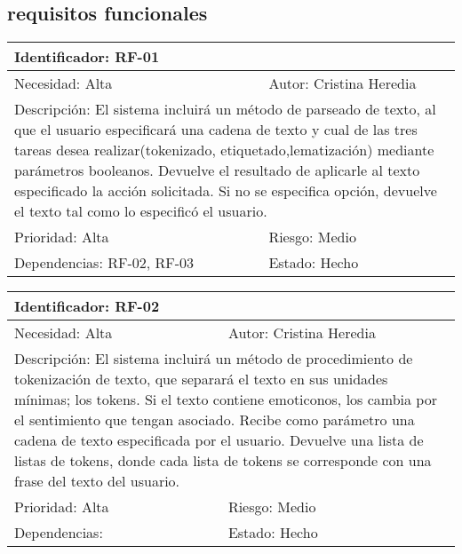 \subsection*{requisitos funcionales}
\begin{table}[H]
\label{my-label}
\begin{tabular}{|l|l|l|l|l|l|l|}
\hline
\multicolumn{7}{|l|}{\textcolor{SchoolColor}{Identificador:} RF-01}                                 \\ \hline
\multicolumn{4}{|l|}{\textcolor{SchoolColor}{Necesidad:} Alta} & \multicolumn{3}{l|}{\textcolor{SchoolColor}{Autor:} Cristina Heredia}         \\ \hline
\multicolumn{7}{|L|}{\textcolor{SchoolColor}{Descripción:} El sistema incluirá un método de parseado de texto, al que el usuario  especificará una cadena de texto y cual de las tres tareas desea realizar(tokenizado, etiquetado,lematización) mediante parámetros booleanos. Devuelve el resultado de aplicarle al texto especificado la acción solicitada. Si no se especifica opción, devuelve el texto tal como lo especificó el usuario.  }                                 \\ \hline
\multicolumn{4}{|l|}{\textcolor{SchoolColor}{Prioridad: }Alta} & \multicolumn{3}{l|}{\textcolor{SchoolColor}{Riesgo:} Medio}         \\ \hline
\multicolumn{5}{|l|}{\textcolor{SchoolColor}{Dependencias: }RF-02, RF-03}         & \multicolumn{2}{l|}{\textcolor{SchoolColor}{Estado:} Hecho} \\ \hline
\end{tabular}
\end{table}
\begin{table}[H]
\label{my-label}
\begin{tabular}{|l|l|l|l|l|l|l|}
\hline
\multicolumn{7}{|l|}{\textcolor{SchoolColor}{Identificador:} RF-02}                                 \\ \hline
\multicolumn{4}{|l|}{\textcolor{SchoolColor}{Necesidad:} Alta} & \multicolumn{3}{l|}{\textcolor{SchoolColor}{Autor:} Cristina Heredia}         \\ \hline
\multicolumn{7}{|L|}{\textcolor{SchoolColor}{Descripción:} El sistema incluirá un método de procedimiento de tokenización de texto, que separará el texto en sus unidades mínimas; los tokens. Si el texto contiene emoticonos, los cambia por el sentimiento que tengan asociado. Recibe como parámetro una cadena de texto especificada por el usuario. Devuelve una lista de listas de tokens, donde cada lista de tokens se corresponde con una frase del texto del usuario. }                                 \\ \hline
\multicolumn{4}{|l|}{\textcolor{SchoolColor}{Prioridad: }Alta} & \multicolumn{3}{l|}{\textcolor{SchoolColor}{Riesgo:} Medio}         \\ \hline
\multicolumn{5}{|l|}{\textcolor{SchoolColor}{Dependencias: }}         & \multicolumn{2}{l|}{\textcolor{SchoolColor}{Estado:} Hecho} \\ \hline
\end{tabular}
\end{table}

